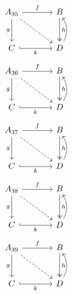 \documentclass{article}
\begin{document}
\begin{equation}\begin{tikzcd}[column sep=large,row sep=large]
A_{35} \arrow[r,"f"] \arrow[d,"g"'] \arrow[dr,dashed] & B \arrow[d,two heads,"h"] \\ C \arrow[r,"k"',hook] & D \arrow[u,bend right]
\end{tikzcd}\end{equation}
\begin{equation}\begin{tikzcd}[column sep=large,row sep=large]
A_{36} \arrow[r,"f"] \arrow[d,"g"'] \arrow[dr,dashed] & B \arrow[d,two heads,"h"] \\ C \arrow[r,"k"',hook] & D \arrow[u,bend right]
\end{tikzcd}\end{equation}
\begin{equation}\begin{tikzcd}[column sep=large,row sep=large]
A_{37} \arrow[r,"f"] \arrow[d,"g"'] \arrow[dr,dashed] & B \arrow[d,two heads,"h"] \\ C \arrow[r,"k"',hook] & D \arrow[u,bend right]
\end{tikzcd}\end{equation}
\begin{equation}\begin{tikzcd}[column sep=large,row sep=large]
A_{38} \arrow[r,"f"] \arrow[d,"g"'] \arrow[dr,dashed] & B \arrow[d,two heads,"h"] \\ C \arrow[r,"k"',hook] & D \arrow[u,bend right]
\end{tikzcd}\end{equation}
\begin{equation}\begin{tikzcd}[column sep=large,row sep=large]
A_{39} \arrow[r,"f"] \arrow[d,"g"'] \arrow[dr,dashed] & B \arrow[d,two heads,"h"] \\ C \arrow[r,"k"',hook] & D \arrow[u,bend right]
\end{tikzcd}\end{equation}
\end{document}
